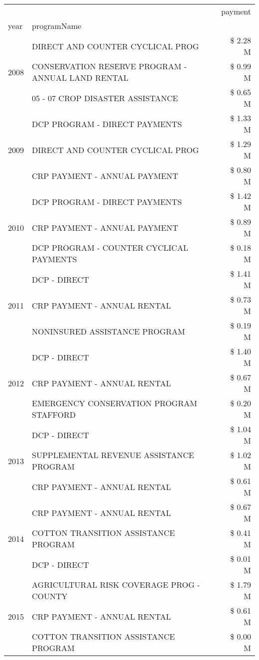 \begin{tabular}{llr}
\toprule
 &  & payment \\
year & programName &  \\
\midrule
\multirow[t]{3}{*}{2008} & DIRECT AND COUNTER CYCLICAL PROG & \$ 2.28 M \\
 & CONSERVATION RESERVE PROGRAM - ANNUAL LAND RENTAL & \$ 0.99 M \\
 & 05 - 07 CROP DISASTER ASSISTANCE & \$ 0.65 M \\
\cline{1-3}
\multirow[t]{3}{*}{2009} & DCP PROGRAM - DIRECT PAYMENTS & \$ 1.33 M \\
 & DIRECT AND COUNTER CYCLICAL PROG & \$ 1.29 M \\
 & CRP PAYMENT - ANNUAL PAYMENT & \$ 0.80 M \\
\cline{1-3}
\multirow[t]{3}{*}{2010} & DCP PROGRAM - DIRECT PAYMENTS & \$ 1.42 M \\
 & CRP PAYMENT - ANNUAL PAYMENT & \$ 0.89 M \\
 & DCP PROGRAM - COUNTER CYCLICAL PAYMENTS & \$ 0.18 M \\
\cline{1-3}
\multirow[t]{3}{*}{2011} & DCP - DIRECT & \$ 1.41 M \\
 & CRP PAYMENT - ANNUAL RENTAL & \$ 0.73 M \\
 & NONINSURED ASSISTANCE PROGRAM & \$ 0.19 M \\
\cline{1-3}
\multirow[t]{3}{*}{2012} & DCP - DIRECT & \$ 1.40 M \\
 & CRP PAYMENT - ANNUAL RENTAL & \$ 0.67 M \\
 & EMERGENCY CONSERVATION PROGRAM STAFFORD & \$ 0.20 M \\
\cline{1-3}
\multirow[t]{3}{*}{2013} & DCP - DIRECT & \$ 1.04 M \\
 & SUPPLEMENTAL REVENUE ASSISTANCE PROGRAM & \$ 1.02 M \\
 & CRP PAYMENT - ANNUAL RENTAL & \$ 0.61 M \\
\cline{1-3}
\multirow[t]{3}{*}{2014} & CRP PAYMENT - ANNUAL RENTAL & \$ 0.67 M \\
 & COTTON TRANSITION ASSISTANCE PROGRAM & \$ 0.41 M \\
 & DCP - DIRECT & \$ 0.01 M \\
\cline{1-3}
\multirow[t]{3}{*}{2015} & AGRICULTURAL RISK COVERAGE PROG - COUNTY & \$ 1.79 M \\
 & CRP PAYMENT - ANNUAL RENTAL & \$ 0.61 M \\
 & COTTON TRANSITION ASSISTANCE PROGRAM & \$ 0.00 M \\
\cline{1-3}

\end{tabular}
